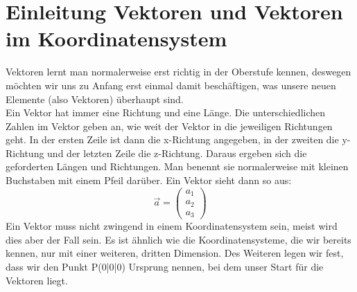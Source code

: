 \section{Einleitung Vektoren und Vektoren im Koordinatensystem}
	Vektoren lernt man normalerweise erst richtig in der Oberstufe kennen, deswegen
	möchten wir uns zu Anfang erst einmal damit beschäftigen, was unsere neuen
	Elemente (also Vektoren) überhaupt sind.\\
	Ein Vektor hat immer eine Richtung und eine Länge. Die unterschiedlichen Zahlen
	im Vektor geben an, wie weit der Vektor in die jeweiligen Richtungen geht. In der
	ersten Zeile ist dann die x-Richtung angegeben, in der zweiten die y-Richtung
	und der letzten Zeile die z-Richtung. Daraus ergeben sich die geforderten
	Längen und Richtungen. Man benennt sie normalerweise mit kleinen Buchstaben mit
	einem Pfeil darüber. Ein Vektor sieht dann so aus:
	\[\vec{a}=\begin{pmatrix}
	 a_1\\
	 a_2\\
	 a_3
	\end{pmatrix}\]
	Ein Vektor muss nicht zwingend in einem Koordinatensystem sein, meist wird dies
	aber der Fall sein. Es ist ähnlich wie die Koordinatensysteme, die wir bereits
	kennen, nur mit einer weiteren, dritten Dimension. Des Weiteren legen wir fest,
	dass wir den Punkt P(0|0|0) Ursprung nennen, bei dem unser Start für die
	Vektoren liegt.

	
